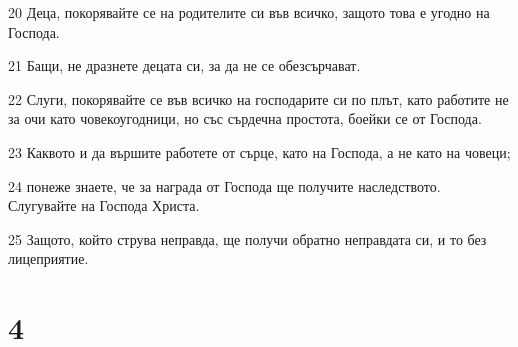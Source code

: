 \par 20 Деца, покорявайте се на родителите си във всичко, защото това е угодно на Господа.
\par 21 Бащи, не дразнете децата си, за да не се обезсърчават.
\par 22 Слуги, покорявайте се във всичко на господарите си по плът, като работите не за очи като човекоугодници, но със сърдечна простота, боейки се от Господа.
\par 23 Каквото и да вършите работете от сърце, като на Господа, а не като на човеци;
\par 24 понеже знаете, че за награда от Господа ще получите наследството. Слугувайте на Господа Христа.
\par 25 Защото, който струва неправда, ще получи обратно неправдата си, и то без лицеприятие.

\chapter{4}

